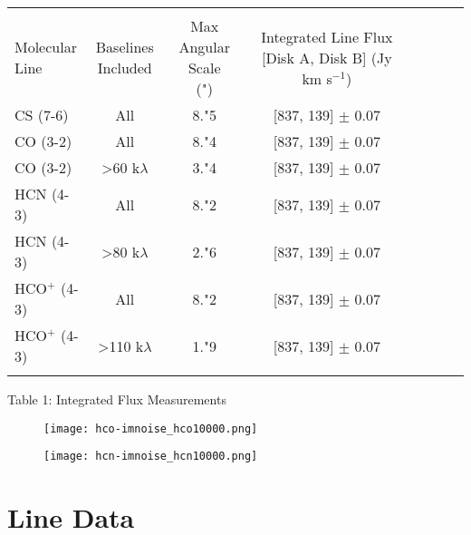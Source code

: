 \begin{tabular}{l*{6}{c}r}
  \hline\hline \\

  \shortstack{Molecular \\ Line} & \shortstack{Baselines \\ Included} & \shortstack{Max Angular Scale \\ (")} & \shortstack{Integrated Line Flux [Disk A, Disk B]\\ (Jy km s$^{-1}$)} \\
  \hline
  CS (7-6)         & All                            & 8."5 & [837, 139] $\pm$ 0.07 \\
  CO (3-2)         & All                            & 8."4 & [837, 139] $\pm$ 0.07 \\
  CO (3-2)         & \textgreater 60 k$\lambda$     & 3."4 & [837, 139] $\pm$ 0.07 \\
  HCN (4-3)        & All                            & 8."2 & [837, 139] $\pm$ 0.07 \\
  HCN (4-3)        & \textgreater 80 k$\lambda$     & 2."6 & [837, 139] $\pm$ 0.07 \\
  HCO$^{+}$ (4-3)  & All                            & 8."2 & [837, 139] $\pm$ 0.07 \\
  HCO$^{+}$ (4-3)  & \textgreater 110 k$\lambda$    & 1."9 & [837, 139] $\pm$ 0.07 \\
  \hline
  \label{baseline_cutting_table}
\end{tabular}
\caption{Table 1: Integrated Flux Measurements}
\bigskip
\bigskip


\begin{figure}
\centering
\begin{minipage}{.48\textwidth}
  \centering
  \texttt{[image: hco-imnoise\_hco10000.png]}
  \label{fig:test1}
\end{minipage}%
\begin{minipage}{.48\textwidth}
  \centering
  \texttt{[image: hcn-imnoise\_hcn10000.png]}
  \label{fig:test2}
\end{minipage}
\end{figure}


\section{Line Data}

